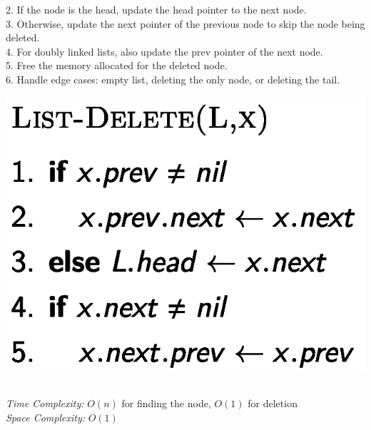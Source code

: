{\begin{minipage}[t]{0.45\textwidth}
\begin{minipage}[htp]{0.65\textwidth}
        2. If the node is the head, update the head pointer to the next node.\\
        3. Otherwise, update the next pointer of the previous node to skip the node being deleted.\\
        4. For doubly linked lists, also update the prev pointer of the next node.\\
        5. Free the memory allocated for the deleted node.\\
        6. Handle edge cases: empty list, deleting the only node, or deleting the tail.
    \end{minipage}
    \begin{minipage}[htp]{0.3\textwidth}
        \begin{center}
            \includegraphics[width=0.9\linewidth]{images/list-delete.png}
        \end{center}
    \end{minipage}\\
    \textit{Time Complexity:} \(O(n)\) for finding the node, \(O(1)\) for deletion \\ \textit{Space Complexity:} \(O(1)\)
\end{minipage}} 
